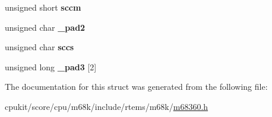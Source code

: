 \begin{DoxyCompactItemize}
unsigned short {\bfseries sccm}
\item 
\mbox{\label{structm360SCCRegisters___a480db3fa9f51ddc29300d10e66337bbc}} 
unsigned char {\bfseries \+\_\+pad2}
\item 
\mbox{\label{structm360SCCRegisters___a3a47ceb518c3016b3ed07cdd3496acba}} 
unsigned char {\bfseries sccs}
\item 
\mbox{\label{structm360SCCRegisters___a380619e4c4d61342118a5f1a88e2b4cd}} 
unsigned long {\bfseries \+\_\+pad3} \mbox{[}2\mbox{]}
\end{DoxyCompactItemize}


The documentation for this struct was generated from the following file\+:\begin{DoxyCompactItemize}
\item 
cpukit/score/cpu/m68k/include/rtems/m68k/\mbox{\hyperlink{m68360_8h}{m68360.\+h}}\end{DoxyCompactItemize}
